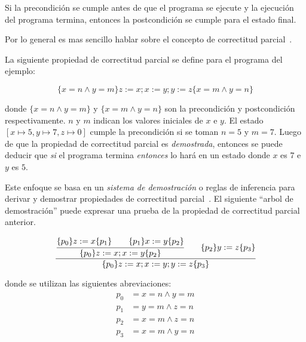 \begin{displayquote}
Si la precondición se cumple antes de que el programa se ejecute y la ejecución del programa termina, entonces la postcondición se cumple para el estado final.
\end{displayquote}

Por lo general es mas sencillo hablar sobre el concepto de correctitud parcial~\cite{nipkow}.


La siguiente propiedad de correctitud parcial se define para el programa del ejemplo:

\begin{equation*}
\lbrace x=n \land y=m \rbrace z:=x; x:=y; y:=z \lbrace x=m \land y=n \rbrace
\end{equation*}

donde $\lbrace x=n \land y=m \rbrace $ y $\lbrace x=m \land y=n \rbrace $ son la precondición y postcondición respectivamente.
$n$ y $m$ indican los valores iniciales de $x$ e $y$.
El estado $[x\mapsto5, y\mapsto7, z\mapsto0]$ cumple la precondición si se toman $n=5$ y $m=7$.
Luego de que la propiedad de correctitud parcial es \textit{demostrada}, entonces se puede deducir que \textit{si} el programa termina \textit{entonces} lo hará en un estado donde $x$ es $7$ e $y$ es $5$.

Este enfoque se basa en un \textit{sistema de demostración} o reglas de inferencia para derivar y demostrar propiedades de correctitud parcial~\cite{nipkow}.
El siguiente ``arbol de demostración'' puede expresar una prueba de la propiedad de correctitud parcial anterior.
\begin{comment}
FIXME demostrar o probar
\end{comment}

\begin{equation*}
\cfrac{
  \cfrac{ \lbrace p_{0} \rbrace z:=x \lbrace p_{1} \rbrace \qquad \lbrace p_{1} \rbrace x:=y \lbrace p_{2} \rbrace }
    { \lbrace p_{0} \rbrace z:=x; x:=y \lbrace p_{2} \rbrace }
  \qquad
 \lbrace p_{2} \rbrace y:=z \lbrace p_{3} \rbrace
  }
  { \lbrace p_{0} \rbrace z:=x; x:=y; y:=z \lbrace p_{3} \rbrace }
\end{equation*}

donde se utilizan las siguientes abreviaciones:
\begin{align*}
p_{0} &= x=n \land y=m\\
p_{1} &= y=m \land z=n\\
p_{2} &= x=m \land z=n\\
p_{3} &= x=m \land y=n
\end{align*}


